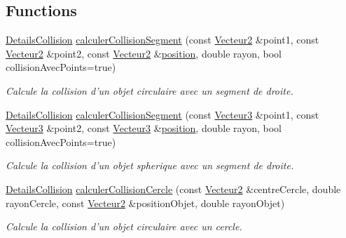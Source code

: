\subsection*{Functions}
\begin{DoxyCompactItemize}
\item 
\hyperlink{classaidecollision_1_1_details_collision}{Details\-Collision} \hyperlink{namespaceaidecollision_a76a6a46bdde378dd6781ae23c1bfa313}{calculer\-Collision\-Segment} (const \hyperlink{group__utilitaire_ga6f7808e68c967b90bd7e737b7e1b78de}{Vecteur2} \&point1, const \hyperlink{group__utilitaire_ga6f7808e68c967b90bd7e737b7e1b78de}{Vecteur2} \&point2, const \hyperlink{group__utilitaire_ga6f7808e68c967b90bd7e737b7e1b78de}{Vecteur2} \&\hyperlink{fmod__codec_8h_a7d71cf36b6a2fc185ecbc89f93fa58a3}{position}, double rayon, bool collision\-Avec\-Points=true)
\begin{DoxyCompactList}\small\item\em Calcule la collision d'un objet circulaire avec un segment de droite. \end{DoxyCompactList}\item 
\hyperlink{classaidecollision_1_1_details_collision}{Details\-Collision} \hyperlink{namespaceaidecollision_aa891c68d5b7e4fa059cfa0cca600cc52}{calculer\-Collision\-Segment} (const \hyperlink{group__utilitaire_ga541aa4837ad9250d3a248dc82ee9ad4d}{Vecteur3} \&point1, const \hyperlink{group__utilitaire_ga541aa4837ad9250d3a248dc82ee9ad4d}{Vecteur3} \&point2, const \hyperlink{group__utilitaire_ga541aa4837ad9250d3a248dc82ee9ad4d}{Vecteur3} \&\hyperlink{fmod__codec_8h_a7d71cf36b6a2fc185ecbc89f93fa58a3}{position}, double rayon, bool collision\-Avec\-Points=true)
\begin{DoxyCompactList}\small\item\em Calcule la collision d'un objet spherique avec un segment de droite. \end{DoxyCompactList}\item 
\hyperlink{classaidecollision_1_1_details_collision}{Details\-Collision} \hyperlink{namespaceaidecollision_aa7ef6624305b37a13f5c583bbbc41882}{calculer\-Collision\-Cercle} (const \hyperlink{group__utilitaire_ga6f7808e68c967b90bd7e737b7e1b78de}{Vecteur2} \&centre\-Cercle, double rayon\-Cercle, const \hyperlink{group__utilitaire_ga6f7808e68c967b90bd7e737b7e1b78de}{Vecteur2} \&position\-Objet, double rayon\-Objet)
\begin{DoxyCompactList}\small\item\em Calcule la collision d'un objet circulaire avec un cercle. \end{DoxyCompactList}\item 

\end{DoxyCompactItemize}
